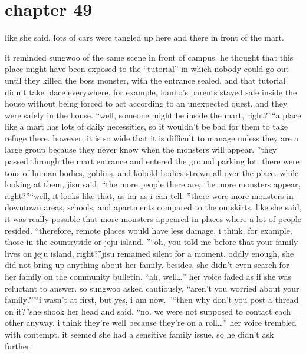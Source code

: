\section{chapter 49}

                            like she said, lots of cars were tangled up here and there in front of the mart.





it reminded sungwoo of the same scene in front of campus.
he thought that this place might have been exposed to the “tutorial” in which nobody could go out until they killed the boss monster, with the entrance sealed.
 and that tutorial didn’t take place everywhere.
 for example, hanho’s parents stayed safe inside the house without being forced to act according to an unexpected quest, and they were safely in the house.
“well, someone might be inside the mart, right?”“a place like a mart has lots of daily necessities, so it wouldn’t be bad for them to take refuge there.
 however, it is so wide that it is difficult to manage unless they are a large group because they never know when the monsters will appear.
”they passed through the mart entrance and entered the ground parking lot.
there were tons of human bodies, goblins, and kobold bodies strewn all over the place.
 while looking at them, jisu said, “the more people there are, the more monsters appear, right?”“well, it looks like that, as far as i can tell.
”there were more monsters in downtown areas, schools, and apartments compared to the outskirts.
like she said, it was really possible that more monsters appeared in places where a lot of people resided.
“therefore, remote places would have less damage, i think.
 for example, those in the countryside or jeju island.
”“oh, you told me before that your family lives on jeju island, right?”jisu remained silent for a moment.
 oddly enough, she did not bring up anything about her family.
besides, she didn’t even search for her family on the community bulletin.
“ah, well…” her voice faded as if she was reluctant to answer.
so sungwoo asked cautiously, “aren’t you worried about your family?”“i wasn’t at first, but yes, i am now.
”“then why don’t you post a thread on it?”she shook her head and said, “no.
 we were not supposed to contact each other anyway.
 i think they’re well because they’re on a roll…” her voice trembled with contempt.
it seemed she had a sensitive family issue, so he didn’t ask further.


